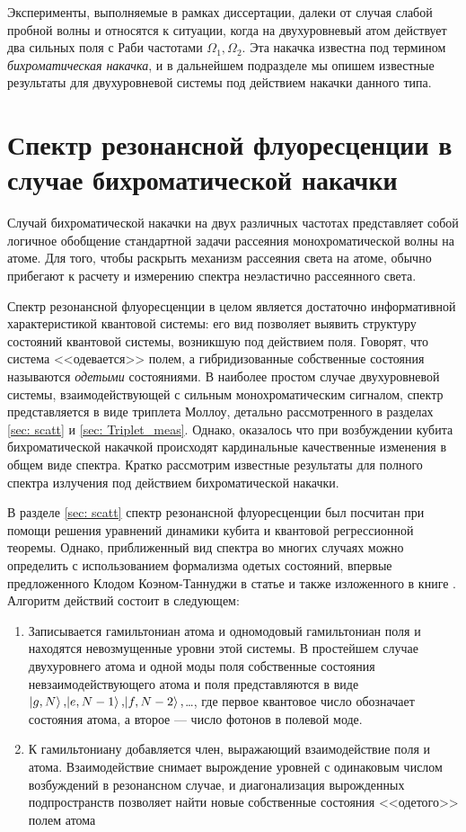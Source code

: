 Эксперименты, выполняемые в рамках диссертации, далеки от случая слабой пробной волны и относятся к ситуации, когда на двухуровневый атом действует два сильных поля с Раби частотами $\Omega_1, \Omega_2$. Эта накачка известна под термином \textit{бихроматическая накачка}, и в дальнейшем подразделе мы опишем известные результаты для двухуровневой системы под действием накачки данного типа. 

\section{Спектр резонансной флуоресценции в случае бихроматической накачки}

Случай бихроматической накачки на двух различных частотах представляет собой логичное обобщение стандартной задачи рассеяния монохроматической волны на атоме. Для того, чтобы раскрыть механизм рассеяния света на атоме, обычно прибегают к расчету и измерению спектра неэластично рассеянного света.

Спектр резонансной флуоресценции в целом является достаточно информативной характеристикой квантовой системы: его вид позволяет выявить структуру состояний квантовой системы, возникшую под действием поля. Говорят, что система <<одевается>> полем, а гибридизованные собственные состояния называются \textit{одетыми} состояниями. В наиболее простом случае двухуровневой системы, взаимодействующей с сильным монохроматическим сигналом, спектр представляется в виде триплета Моллоу, детально рассмотренного в разделах \ref{sec: scatt} и \ref{sec: Triplet_meas}. Однако, оказалось что при возбуждении кубита бихроматической накачкой происходят кардинальные качественные изменения в общем виде спектра. Кратко рассмотрим известные результаты для полного спектра излучения под действием бихроматической накачки. 


В разделе \ref{sec: scatt} спектр резонансной флуоресценции был посчитан при помощи решения уравнений динамики кубита и квантовой регрессионной теоремы. Однако, приближенный вид спектра во многих случаях можно определить с использованием формализма одетых состояний, впервые предложенного Клодом Коэном-Таннуджи в статье \cite{cohen1977dressed} и также изложенного в книге \cite{cohen1998atom}. Алгоритм действий состоит в следующем:
\begin{enumerate}
	\item Записывается гамильтониан атома и одномодовый гамильтониан поля и находятся невозмущенные уровни этой системы. В простейшем случае двухуровнего атома и одной моды поля собственные состояния невзаимодействующего атома и поля представляются в виде $\ket{g, N},\!\ket{e, N-1},\!\ket{f, N-2},$\ldots, где первое квантовое число обозначает состояния атома, а второе --- число фотонов в полевой моде. 
	\item К гамильтониану добавляется член, выражающий взаимодействие поля и атома. Взаимодействие снимает вырождение уровней с одинаковым числом возбуждений в резонансном случае, и диагонализация вырожденных подпространств позволяет найти новые собственные состояния <<одетого>> полем атома
\end{enumerate}
